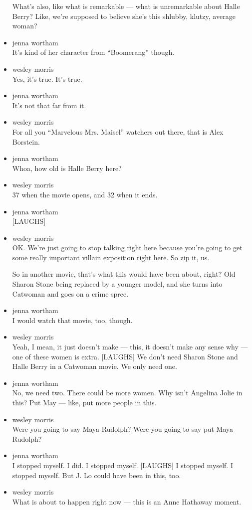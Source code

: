 \begin{itemize}
  What's also, like what is remarkable --- what is unremarkable about
  Halle Berry? Like, we're supposed to believe she's this shlubby,
  klutzy, average woman?
\item
  jenna wortham\\
  It's kind of her character from ``Boomerang'' though.
\item
  wesley morris\\
  Yes, it's true. It's true.
\item
  jenna wortham\\
  It's not that far from it.
\item
  wesley morris\\
  For all you ``Marvelous Mrs. Maisel'' watchers out there, that is Alex
  Borstein.
\item
  jenna wortham\\
  Whoa, how old is Halle Berry here?
\item
  wesley morris\\
  37 when the movie opens, and 32 when it ends.
\item
  jenna wortham\\
  {[}LAUGHS{]}
\item
  wesley morris\\
  OK. We're just going to stop talking right here because you're going
  to get some really important villain exposition right here. So zip it,
  us.

  So in another movie, that's what this would have been about, right?
  Old Sharon Stone being replaced by a younger model, and she turns into
  Catwoman and goes on a crime spree.
\item
  jenna wortham\\
  I would watch that movie, too, though.
\item
  wesley morris\\
  Yeah, I mean, it just doesn't make --- this, it doesn't make any sense
  why --- one of these women is extra. {[}LAUGHS{]} We don't need Sharon
  Stone and Halle Berry in a Catwoman movie. We only need one.
\item
  jenna wortham\\
  No, we need two. There could be more women. Why isn't Angelina Jolie
  in this? Put May --- like, put more people in this.
\item
  wesley morris\\
  Were you going to say Maya Rudolph? Were you going to say put Maya
  Rudolph?
\item
  jenna wortham\\
  I stopped myself. I did. I stopped myself. {[}LAUGHS{]} I stopped
  myself. I stopped myself. But J. Lo could have been in this, too.
\item
  wesley morris\\
  What is about to happen right now --- this is an Anne Hathaway moment.


\end{itemize}
